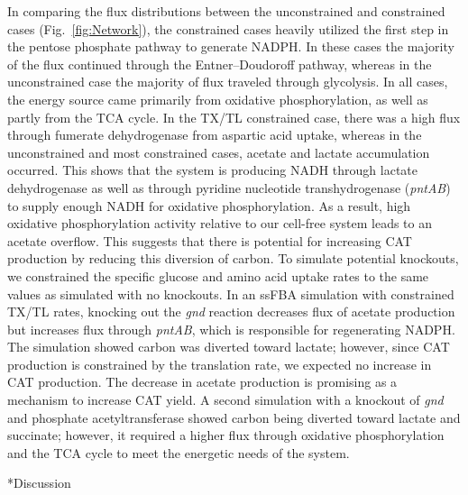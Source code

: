 \documentclass[12pt]{article}
\makeatletter
\renewcommand\section{\@startsection
	{subsection}{2}{0mm}
	{-0.2in}
	{0.05\baselineskip}
	{\normalfont\large\bfseries}}
\makeatother
\begin{document}
In comparing the flux distributions between the unconstrained and constrained cases (Fig.~\ref{fig:Network}), the constrained cases heavily utilized the first step in the pentose phosphate pathway to generate NADPH.
In these cases the majority of the flux continued through the Entner–Doudoroff pathway, whereas in the unconstrained case the majority of flux traveled through glycolysis.
In all cases, the energy source came primarily from oxidative phosphorylation, as well as partly from the TCA cycle.
In the TX/TL constrained case, there was a high flux through fumerate dehydrogenase from aspartic acid uptake, whereas in the unconstrained and most constrained cases, acetate and lactate accumulation occurred.
This shows that the system is producing NADH through lactate dehydrogenase as well as through pyridine nucleotide transhydrogenase (\textit{pntAB}) to supply enough NADH for oxidative phosphorylation.
As a result, high oxidative phosphorylation activity relative to our cell-free system leads to an acetate overflow.
This suggests that there is potential for increasing CAT production by reducing this diversion of carbon.
To simulate potential knockouts, we constrained the specific glucose and amino acid uptake rates to the same values as simulated with no knockouts.
In an ssFBA simulation with constrained TX/TL rates, knocking out the \textit{gnd} reaction decreases flux of acetate production but increases flux through \textit{pntAB}, which is responsible for regenerating NADPH.
The simulation showed carbon was diverted toward lactate; however, since CAT production is constrained by the translation rate, we expected no increase in CAT production.
The decrease in acetate production is promising as a mechanism to increase CAT yield. 
A second simulation with a knockout of \textit{gnd} and phosphate acetyltransferase showed carbon being diverted toward lactate and succinate; however, it required a higher flux through oxidative phosphorylation and the TCA cycle to meet the energetic needs of the system.   

\clearpage

\section*{Discussion}

\end{document}
